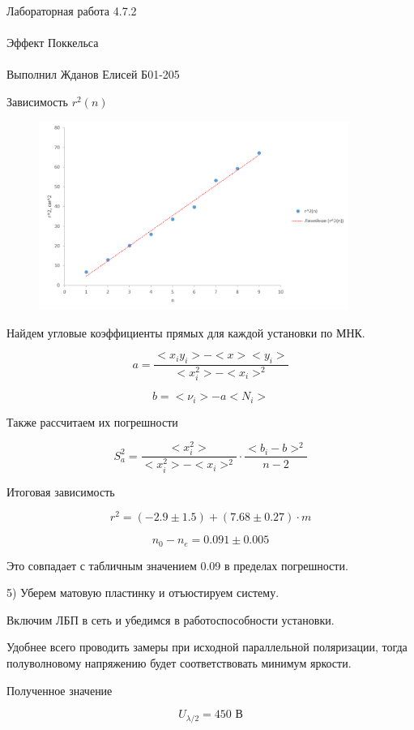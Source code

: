 \documentclass{astroedu-lab}
\begin{document}
\begin{problem}{\huge Лабораторная работа 4.7.2\\\\Эффект Поккельса\\\\Выполнил Жданов Елисей Б01-205}
\begin{center}
	\Large Зависимость $r^2(n)$
\end{center}

\begin{figure}[!h]
	\centering
	\includegraphics[width=0.9\textwidth]{граф1.png}
	\label{fig:boiler}
\end{figure}

Найдем угловые коэффициенты прямых для каждой установки по МНК.

\[
	a = \frac{<x_i y_i> - < x > < y_i >}{< x_i^2> - < x_i >^2}
\]

\[
	b = < \nu_i > - a < N_i >
\]

Также рассчитаем их погрешности

\begin{equation}
	S_a^2 = \frac{< x_i^2>}{< x_i^2 > - < x_i >^2} \cdot \frac{<  b_i - b > ^2}{n - 2}
\end{equation}

Итоговая зависимость

$$r^2 = (-2.9 \pm 1.5) + (7.68 \pm 0.27) \cdot m$$

\begin{equation}
	n_0 - n_e = 0.091 \pm 0.005
\end{equation}

Это совпадает с табличным значением 0.09 в пределах погрешности.

5) Уберем матовую пластинку и отъюстируем систему.

Включим ЛБП в сеть и убедимся в работоспособности установки.

Удобнее всего проводить замеры при исходной параллельной поляризации, тогда полуволновому напряжению будет соответствовать минимум яркости.

Полученное значение

\begin{equation}
	U_{\lambda / 2} = 450 \text{ В}
\end{equation}


\end{problem}
\end{document}
